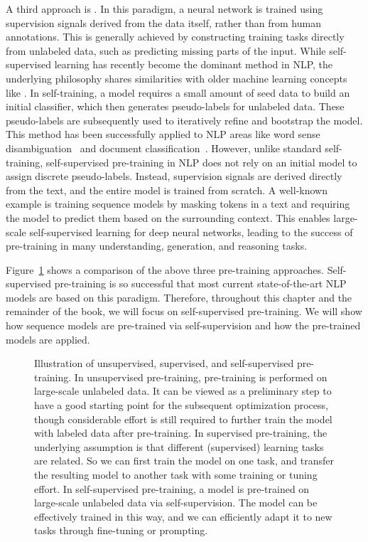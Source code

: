 A third approach is . In this paradigm, a neural network is trained using supervision signals derived from the data itself, rather than from human annotations. This is generally achieved by constructing training tasks directly from unlabeled data, such as predicting missing parts of the input. While self-supervised learning has recently become the dominant method in NLP, the underlying philosophy shares similarities with older machine learning concepts like . In self-training, a model requires a small amount of seed data to build an initial classifier, which then generates pseudo-labels for unlabeled data. These pseudo-labels are subsequently used to iteratively refine and bootstrap the model. This method has been successfully applied to NLP areas like word sense disambiguation~\cite{yarowsky:1995unsupervised} and document classification~\cite{blum-and-tom:1998combining}. However, unlike standard self-training, self-supervised pre-training in NLP does not rely on an initial model to assign discrete pseudo-labels. Instead, supervision signals are derived directly from the text, and the entire model is trained from scratch. A well-known example is training sequence models by masking tokens in a text and requiring the model to predict them based on the surrounding context.  This enables large-scale self-supervised learning for deep neural networks, leading to the success of pre-training in many understanding, generation, and reasoning tasks.

Figure~\ref{fig:unsupervised-supervised-self-supervised-pre-training} shows a comparison of the above three pre-training approaches. Self-supervised pre-training is so successful that most current state-of-the-art NLP models are based on this paradigm. Therefore, throughout this chapter and the remainder of the book, we will focus on self-supervised pre-training. We will show how sequence models are pre-trained via self-supervision and how the pre-trained models are applied.

\begin{figure}[!t]
\centering

\caption{Illustration of unsupervised, supervised, and self-supervised pre-training. In unsupervised pre-training, pre-training is performed on large-scale unlabeled data. It can be viewed as a preliminary step to have a good starting point for the subsequent optimization process, though considerable effort is still required to further train the model with labeled data after pre-training. In supervised pre-training, the underlying assumption is that different (supervised) learning tasks are related. So we can first train the model on one task, and transfer the resulting model to another task with some training or tuning effort. In self-supervised pre-training, a model is pre-trained on large-scale unlabeled data via self-supervision. The model can be effectively trained in this way, and we can efficiently adapt it to new tasks through fine-tuning or prompting.}
\label{fig:unsupervised-supervised-self-supervised-pre-training}
\end{figure}

